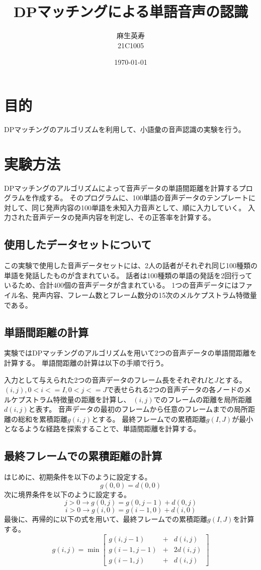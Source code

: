 \documentclass[a4paper,12pt]{article}
\title{DPマッチングによる単語音声の認識}
\author{麻生英寿 \\ 21C1005}
\date{\today}
\begin{document}
\maketitle

\tableofcontents

\section{目的}
DPマッチングのアルゴリズムを利用して、小語彙の音声認識の実験を行う。

\section{実験方法}
DPマッチングのアルゴリズムによって音声データの単語間距離を計算するプログラムを作成する。
そのプログラムに、100単語の音声データのテンプレートに対して、同じ発声内容の100単語を未知入力音声として、順に入力していく。
入力された音声データの発声内容を判定し、その正答率を計算する。

\subsection{使用したデータセットについて}
この実験で使用した音声データセットには、2人の話者がそれぞれ同じ100種類の単語を発話したものが含まれている。
話者は100種類の単語の発話を2回行っているため、合計400個の音声データが含まれている。
1つの音声データにはファイル名、発声内容、フレーム数とフレーム数分の15次のメルケプストラム特徴量である。

\subsection{単語間距離の計算}
実験ではDPマッチングのアルゴリズムを用いて2つの音声データの単語間距離を計算する。
単語間距離の計算は以下の手順で行う。

入力として与えられた2つの音声データのフレーム長をそれぞれ$I$と$J$とする。
$(i,j),0<i<=I,0<j<=J$で表せられる2つの音声データの各ノードのメルケプストラム特徴量の距離を計算し、
$(i,j)$でのフレームの距離を局所距離$d(i,j)$と表す。
音声データの最初のフレームから任意のフレームまでの局所距離の総和を累積距離$g(i,j)$とする。
最終フレームでの累積距離$g(I,J)$が最小となるような経路を探索することで、単語間距離を計算する。

\subsection{最終フレームでの累積距離の計算}
はじめに、初期条件を以下のように設定する。
\[
    g(0,0) = d(0,0)
\]
次に境界条件を以下のように設定する。
\[
    j>0 \rightarrow g(0,j) = g(0,j-1) + d(0,j)
\]
\[
    i>0 \rightarrow g(i,0) = g(i-1,0) + d(i,0)
\]
最後に、再帰的に以下の式を用いて、最終フレームでの累積距離$g(I,J)$を計算する。
\[
g(i, j)=\min \left[\begin{array}{llr}
g(i, j-1) & + & d(i, j) \\
g(i-1, j-1) & + & 2 d(i, j) \\
g(i-1, j) & + & d(i, j)
\end{array}\right]
\]
\end{document}
